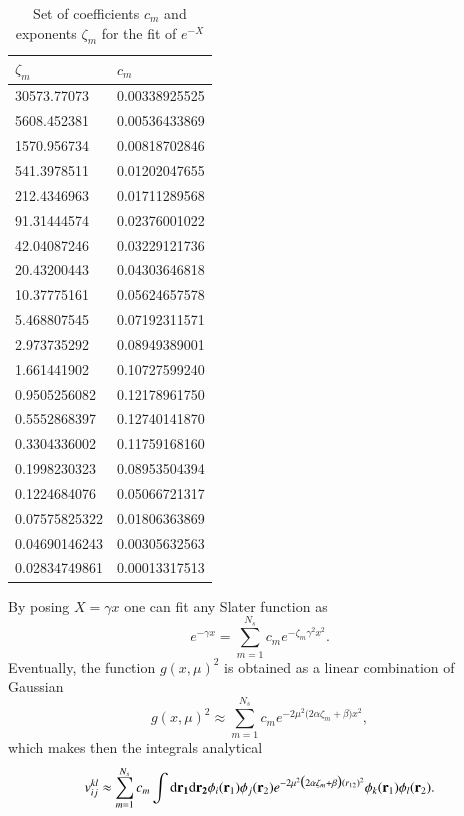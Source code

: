 \documentclass[aip,jcp,reprint,noshowkeys,superscriptaddress]{revtex4-1}
\newcommand{\bri}[1]{{\bf r}_{#1}}
\newcommand{\dr}[1]{\text{d}{\bf r_{#1}}}
\begin{document}
\begin{table}
\label{gauss_fit}
\caption{Set of coefficients $c_m$ and exponents $\zeta_m$ for the fit of $e^{-X}$}
\begin{ruledtabular}
\begin{tabular}{ll}
 $\zeta_m$ & $c_m$ \\
\hline                 
   30573.77073         & 0.00338925525  \\
   5608.452381         & 0.00536433869  \\
   1570.956734         & 0.00818702846  \\
   541.3978511         & 0.01202047655  \\
   212.4346963         & 0.01711289568  \\
   91.31444574         & 0.02376001022  \\
   42.04087246         & 0.03229121736  \\
   20.43200443         & 0.04303646818  \\
   10.37775161         & 0.05624657578  \\
   5.468807545         & 0.07192311571  \\
   2.973735292         & 0.08949389001  \\
   1.661441902         & 0.10727599240  \\
   0.9505256082        & 0.12178961750  \\
   0.5552868397        & 0.12740141870  \\
   0.3304336002        & 0.11759168160  \\
   0.1998230323        & 0.08953504394  \\
   0.1224684076        & 0.05066721317  \\
   0.07575825322       & 0.01806363869  \\
   0.04690146243       & 0.00305632563  \\
   0.02834749861       & 0.00013317513  \\
\end{tabular}
\end{ruledtabular}
\end{table}
By posing $X=\gamma x$ one can fit any Slater function as
\begin{equation}
 e^{-\gamma x} = \sum_{m=1}^{N_s} c_m e^{-\zeta_m \gamma^2 x^2}. 
\end{equation}
Eventually, the function $g(x,\mu)^2$ is obtained as a linear combination of Gaussian
\begin{equation}
 g(x,\mu)^2 \approx \sum_{m=1}^{N_s} c_m e^{-2\mu^2\big(2 \alpha \zeta_m + \beta\big) x^2},
\end{equation}
which makes then the integrals analytical
\begin{equation}
 v_{ij}^{kl} \approx \sum_{m=1}^{N_s} c_m \int \dr{1} \dr{2} \phi_i(\bri{1}) \phi_j(\bri{2}) e^{-2\mu^2\big(2 \alpha \zeta_m + \beta\big) (r_{12})^2} \phi_k(\bri{1}) \phi_l(\bri{2}).
\end{equation}
\end{document}
